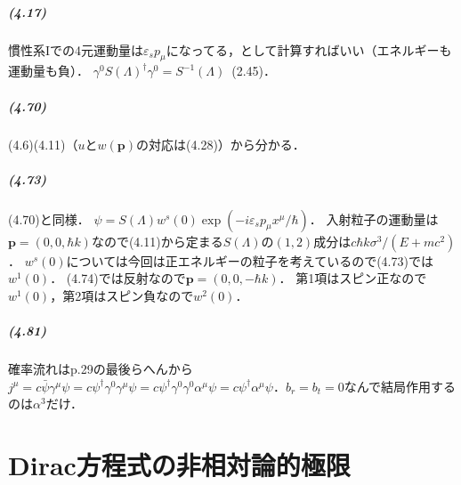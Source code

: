 \paragraph{(4.17)}
慣性系Iでの4元運動量は$\varepsilon_sp_\mu$になってる，として計算すればいい（エネルギーも運動量も負）．
$\gamma^0 S(\Lambda)^\dagger \gamma^0 = S^{ - 1}(\Lambda)$~(2.45)．

\paragraph{(4.70)}
(4.6)(4.11)（$u$と$w(\boldsymbol{p})$の対応は(4.28)）から分かる．

\paragraph{(4.73)}
(4.70)と同様．
$\psi=S(\Lambda)w^s(0)\exp( - i\varepsilon_sp_\mu x^\mu/\hbar)$．
入射粒子の運動量は$\boldsymbol{p}=(0,0,\hbar k)$なので(4.11)から定まる$S(\Lambda)$の$(1,2)$成分は$c\hbar k\sigma^3/(E + mc^2)$．
$w^s(0)$については今回は正エネルギーの粒子を考えているので(4.73)では$w^1(0)$．
(4.74)では反射なので$\boldsymbol{p}=(0,0, - \hbar k)$．
第1項はスピン正なので$w^1(0)$，第2項はスピン負なので$w^2(0)$．

\paragraph{(4.81)}
確率流れはp.29の最後らへんから$j^\mu=c\bar{\psi}\gamma^\mu\psi=c\psi^\dagger\gamma^0\gamma^\mu\psi=c\psi^\dagger\gamma^0\gamma^0\alpha^\mu\psi=c\psi^\dagger\alpha^\mu\psi$．$b_r=b_t=0$なんで結局作用するのは$\alpha^3$だけ．

\chapter{Dirac方程式の非相対論的極限}
